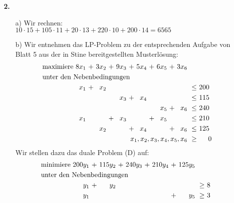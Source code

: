 \documentclass [a4paper,11pt]{article}
\begin{document}
\begin{enumerate}
        \item[\textbf{2.}]
            \begin{enumerate}
                \item[a)]
                    Wir rechnen:\\
                    $ 10 \cdot 15 + 105 \cdot 11 + 20 \cdot 13 + 220 \cdot 10 + 200 \cdot 14 = 6565 $
                \item[b)]
                    Wir entnehmen das LP-Problem zu der entsprechenden Aufgabe von Blatt 5 aus der in Stine bereitgestellten Musterlösung:\\
                    \begin{align*}
                    \begin{alignedat}{10}
                    & \text{maximiere } & 8x_1 &\ + &\ 3x_2 &\ + &\ 9x_3 &\ + &\ 5x_4 &\ + &\ 6x_5 &\ + &\ 3x_6 & & \\
                    & \rlap{unter den Nebenbedingungen} & & & & & & & & & & & & & \\
                    && x_1 &\ + &\ x_2 & & & & & & & & &\ \leq &\ 200\ \\
                    &&     &    &      & & x_3 &\ + &\ x_4 & & & & &\ \leq &\ 115\ \\
                    &&     &    &      & &     &    &      & &\ x_5 &\ + &\ x_6 &\ \leq &\ 240\ \\
                    && x_1 &    &      &\ + &\ x_3 & & &\ + &\ x_5 & & &\ \leq &\ 210\ \\
                    &&     &    &\ x_2 &    &      &\ + &\ x_4 & & &\ + &\ x_6 &\ \leq &\ 125\ \\
                    && & & & & & & & & & & \llap{$x_1,x_2,x_3,x_4,x_5,x_6$} &\ \geq &\ 0
                    \end{alignedat}
                    \end{align*}
                    Wir stellen dazu das duale Problem (D) auf:
                    \begin{align*}
                    \begin{alignedat}{10}
                    & \text{minimiere } & 200y_1 &\ + &\ 115y_2 &\ + &\ 240y_3 &\ + &\ 210y_4 &\ + &\ 125y_5 & & \\
                    & \rlap{unter den Nebenbedingungen} & & & & & & & & & & &  \\
                    && y_1 &\ + &\ y_2 & & & & & & &\ \geq &\ 8\ \\
                    && y_1 & & & & & & &\ + &\ y_5 &\ \geq &\ 3\ \\

\end{alignedat}
\end{align*}
\end{enumerate}
\end{enumerate}
\end{document}
